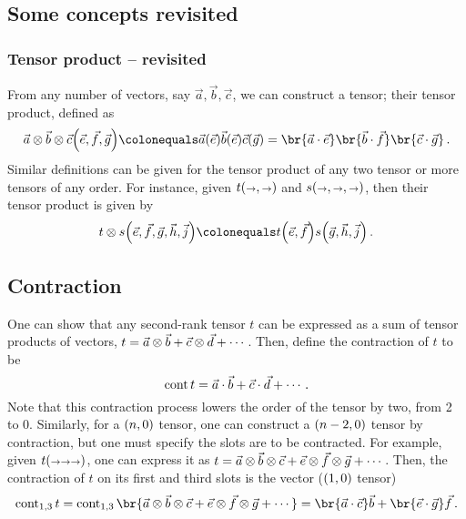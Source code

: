 \subsection{Some concepts revisited}
%
\subsubsection{Tensor product -- revisited}

From any number of vectors, say $\vec a, \vec b, \vec c$, we can construct a tensor; their tensor product, defined as
%
\begin{equation*}
  \vec a\tprod\vec b\tprod\vec c\vat{\vec e, \vec f, \vec g} \defas \vec a\vat{\vec e}\vec b\vat{\vec e}\vec c\vat{\vec g}
                                                              = \br{\vec a\iprod \vec e}\br{\vec b\iprod\vec f}\br{\vec c\iprod\vec g}\,.
\end{equation*}
%
Similar definitions can be given for the tensor product of any two tensor or more tensors of any order. For instance, given $t\vat{\vslot,\vslot}$ and $s\vat{\vslot,\vslot,\vslot}$, then their tensor product is given by
%
\begin{equation*}
  t\tprod s\vat{\vec e,\vec f,\vec g,\vec h,\vec j} \defas t\vat{\vec e,\vec f}s\vat{\vec g,\vec h,\vec j}\,.
\end{equation*}


\subsection{Contraction}

One can show that any second-rank tensor $t$ can be expressed as a sum of tensor products of vectors, $t = \vec a\otimes\vec b + \vec c\otimes\vec d + \dotsb$. Then, define the contraction of $t$ to be
%
\begin{equation*}
  \operatorname{cont} t = \vec a\cdot\vec b + \vec c\cdot\vec d + \dotsb\,.
\end{equation*}
%
Note that this contraction process lowers the order of the tensor by two, from 2 to 0. Similarly, for a $\torder n0$ tensor, one can construct a $\torder{n - 2}{0}$ tensor by contraction, but one must specify the slots are to be contracted. For example, given $t\vat{\vslot\vslot\vslot}$, one can express it as $t = \vec a\otimes\vec b\otimes\vec c + \vec e\otimes\vec f\otimes\vec g + \dotsb$. Then, the contraction of $t$ on its first and third slots is the vector ($\torder 10$ tensor)
%
\begin{equation*}
  \cont_{1,3} t = \cont_{1,3}\br{\vec a\tprod\vec b\tprod\vec c + \vec e\tprod\vec f\tprod\vec g + \dotsb}
                = \br{\vec a\iprod\vec c}\vec b + \br{\vec e\iprod\vec g}\vec f\,.
\end{equation*}
